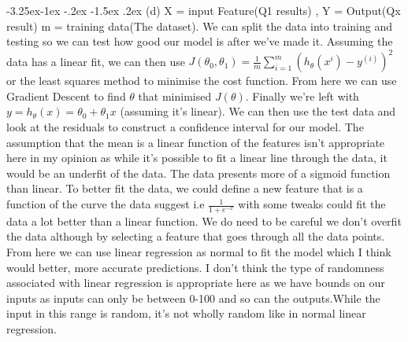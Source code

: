 \documentclass[10pt]{article} %
\makeatletter
\renewcommand\subsection{\@startsection{subsection}{2}{\z@}%
                                     {-3.25ex\@plus -1ex \@minus -.2ex}%
                                     {-1.5ex \@plus .2ex}%
                                     {\normalfont\large\bfseries}}
\makeatother
\begin{document}
\subsection{(d)}
X = input Feature(Q1 results) , Y = Output(Qx result)
\newline m = training data(The dataset). We can split the data into training and testing so we can test how good our model is after we've made it.
\newline Assuming the data has a linear fit, we can then use \(J(\theta_0,\theta_1)=\frac{1}{m}\sum_{i=1}^{m}(h_\theta(x^i)-y^(i))^2\) or the least squares method to minimise the cost function. From here we can use Gradient Descent to find \(\theta\) that minimised \(J(\theta)\). Finally we're left with \(y = h_\theta(x) = \theta_0 +\theta_1x\) (assuming it's linear). We can then use the test data and look at the residuals to construct a confidence interval for our model.
\newline
The assumption that the mean is a linear function of the features isn't appropriate here in my opinion as while it's possible to fit a linear line through the data, it would be an underfit of the data. The data presents more of a sigmoid function than linear. To better fit the data, we could define a new feature that is a function of the curve the data suggest i.e \(\frac{1}{1+e^{-x}}\) with some tweaks could fit the data a lot better than a linear function. We do need to be careful we don't overfit the data although by selecting a feature that goes through all the data points. From here we can use linear regression as normal to fit the model which I think would better, more accurate predictions. 
\newline
I don't think the type of randomness associated with linear regression is appropriate here as we have bounds on our inputs as inputs can only be between 0-100 and so can the outputs.While the input in this range is random, it's not wholly random like in normal linear regression.
\newpage
\end{document}
